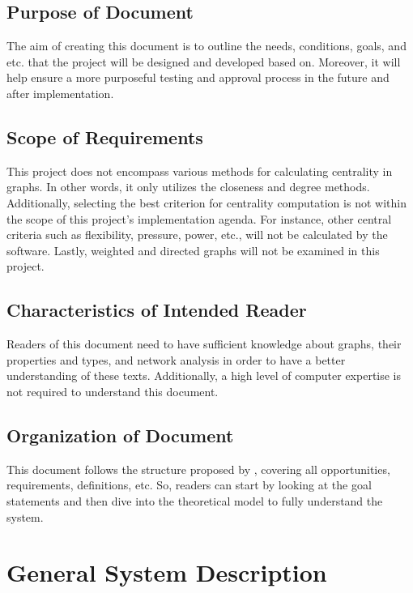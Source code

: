 \documentclass[12pt]{article}
\begin{document}
\subsection{Purpose of Document}
The aim of creating this document is to outline the needs, conditions, goals, and etc. that the project will be designed and developed based on. Moreover, it will help ensure a more purposeful testing and approval process in the future and after implementation.

\subsection{Scope of Requirements} 


This project does not encompass various methods for calculating centrality in graphs. In other words, it only utilizes the closeness  and degree methods. Additionally, selecting the best criterion for centrality computation is not within the scope of this project's implementation agenda. For instance, other central criteria such as flexibility, pressure, power, etc., will not be calculated by the software. Lastly, weighted and directed graphs will not be examined in this project.

\subsection{Characteristics of Intended Reader} \label{sec_IntendedReader}


Readers of this document need to have sufficient knowledge about graphs, their properties and types, and network analysis in order to have a better understanding of these texts. Additionally, a high level of computer expertise is not required to understand this document.

\subsection{Organization of Document}

This document follows the structure proposed by \citet{SmithandLai2005}, covering all opportunities, requirements, definitions, etc. So, readers can start by looking at the goal statements and then dive into the theoretical model to fully understand the system.

\section{General System Description}
\end{document}
